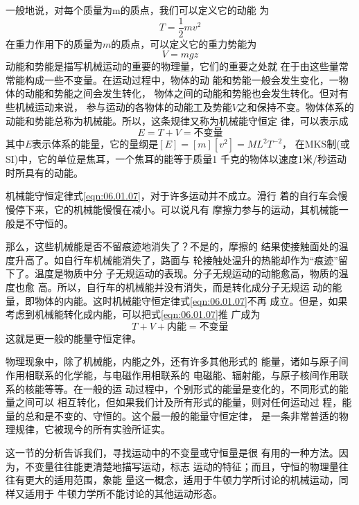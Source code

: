 一般地说，对每个质量为m的质点，我们可以定义它的动能
为
\begin{equation*}
  T = \frac { 1 } { 2 } m v ^ { 2 }
\end{equation*}
在重力作用下的质量为$ m $的质点，可以定义它的重力势能为
\begin{equation*}
  V = m g z
\end{equation*}
动能和势能是描写机械运动的重要的物理量，它们的重要之处就
在于由这些量常常能构成一些不变量。在运动过程中，物体的动
能和势能一般会发生变化，一物体的动能和势能之间会发生转化，
物体之间的动能和势能也会发生转化。但对有些机械运动来说，
参与运动的各物体的动能工及势能$ V $之和保持不变。物体体系的
动能和势能总称为机械能。所以，这条规律又称为机械能守恒定
律，可以表示成
\begin{equation}\label{eqn:06.01.07}
  E = T + V = \text{不变量}
\end{equation}
其中$ E $表示体系的能量，它的量纲是$ [ E ] = [ m ][ v ^ { 2 } ] = M L ^ { 2 } T ^ { - 2 } $，
在MKS制(或SI)中，它的单位是焦耳，一个焦耳的能等于质量1
千克的物体以速度1米/秒运动时所具有的动能。

机械能守恒定律\lhbrak 式\eqref{eqn:06.01.07}\rhbrak ，对于许多运动并不成立。滑行
着的自行车会慢慢停下来，它的机械能慢慢在减小。可以说凡有
摩擦力参与的运动，其机械能一般是不守恒的。

那么，这些机械能是否不留痕迹地消失了？不是的，摩擦的
结果使接触面处的温度升高了。如自行车机械能消失了，路面与
轮接触处温升的热能却作为“痕迹”留下了。温度是物质中分
子无规运动的表现。分子无规运动的动能愈高，物质的温度也愈
高。所以，自行车的机械能并没有消失，而是转化成分子无规运
动的能量，即物体的内能。这时机械能守恒定律\lhbrak 式\eqref{eqn:06.01.07}\rhbrak 不再
成立。但是，如果考虑到机械能转化成内能，可以把式\eqref{eqn:06.01.07}推
广成为
\begin{equation*}
  T + V + \text{内能} = \text{不变量}
\end{equation*}
这就是更一般的能量守恒定律。

物理现象中，除了机械能，内能之外，还有许多其他形式的
能量，诸如与原子间作用相联系的化学能，与电磁作用相联系的
电磁能、辐射能，与原子核间作用联系的核能等等。在一般的运
动过程中，个别形式的能量是变化的，不同形式的能量之间可以
相互转化，但如果我们计及所有形式的能量，则对任何运动过
程，能量的总和是不变的、守恒的。这个最一般的能量守恒定律，
是一条非常普适的物理规律，它被现今的所有实验所证实。

这一节的分析告诉我们，寻找运动中的不变量或守恒量是很
有用的一种方法。因为，不变量往往能更清楚地描写运动，标志
运动的特征；而且，守恒的物理量往往有更大的适用范围，象能
量这一概念，适用于牛顿力学所讨论的机械运动，同样又适用于
牛顿力学所不能讨论的其他运动形态。